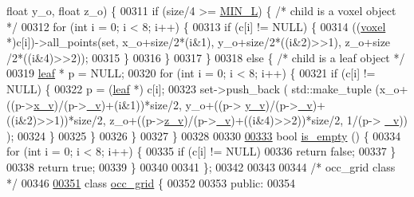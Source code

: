 \begin{DoxyCode}
{      float} y\_o, \textcolor{keywordtype}{float} z\_o) \{
00311         \textcolor{keywordflow}{if} (size/4 >= \hyperlink{Voxel_8hpp_a29d8f4bb35f9fa62e1d680bc6ab1f4f1}{MIN\_L}) \{ \textcolor{comment}{/* child is a voxel object */}
00312             \textcolor{keywordflow}{for} (\textcolor{keywordtype}{int} i = 0; i < 8; i++) \{
00313                 \textcolor{keywordflow}{if} (c[i] != NULL) \{
00314                     ((\hyperlink{classvoxel}{voxel} *)c[i])->all\_points(\textcolor{keyword}{set}, x\_o+size/2*(i&1), y\_o+size/2*((i&2)>>1), z\_o+size
      /2*((i&4)>>2));
00315                 \}
00316             \}
00317         \}
00318         \textcolor{keywordflow}{else} \{ \textcolor{comment}{/* child is a leaf object */}
00319             \hyperlink{classleaf}{leaf} * p = NULL;
00320             \textcolor{keywordflow}{for} (\textcolor{keywordtype}{int} i = 0; i < 8; i++) \{
00321                 \textcolor{keywordflow}{if} (c[i] != NULL) \{
00322                     p = (\hyperlink{classleaf}{leaf} *) c[i];
00323                     \textcolor{keyword}{set}->push\_back ( std::make\_tuple (x\_o+((p->\hyperlink{classleaf_ac34a93ca5739928d7389b12e735252d4}{x\_v})/(p->\hyperlink{classleaf_a4fc347dbd4f5911bbb477910588ed512}{\_v})+(i&1))*size/2, y\_o+((p->
      \hyperlink{classleaf_a06a94d40da44b846913db4d8900b2626}{y\_v})/(p->\hyperlink{classleaf_a4fc347dbd4f5911bbb477910588ed512}{\_v})+((i&2)>>1))*size/2, z\_o+((p->\hyperlink{classleaf_a5f51fe13eb6e53bd9549469011e7a10e}{z\_v})/(p->\hyperlink{classleaf_a4fc347dbd4f5911bbb477910588ed512}{\_v})+((i&4)>>2))*size/2, 1/(p->
      \hyperlink{classleaf_a4fc347dbd4f5911bbb477910588ed512}{\_v})) );
00324                 \}
00325             \}
00326         \}
00327     \}
00328 
00330 
\hypertarget{Voxel_8hpp_source.tex_l00333}{}\hyperlink{classvoxel_afe0d1d928ee0358b0fc0a67f58793cfd}{00333}     \textcolor{keywordtype}{bool} \hyperlink{classvoxel_afe0d1d928ee0358b0fc0a67f58793cfd}{is\_empty} () \{
00334         \textcolor{keywordflow}{for} (\textcolor{keywordtype}{int} i = 0; i < 8; i++) \{
00335             \textcolor{keywordflow}{if} (c[i] != NULL)
00336                 \textcolor{keywordflow}{return} \textcolor{keyword}{false};
00337         \}
00338         \textcolor{keywordflow}{return} \textcolor{keyword}{true};
00339     \}
00340 
00341 \};
00342 
00343 
00344 \textcolor{comment}{/* occ\_grid class */}
00346 
\hypertarget{Voxel_8hpp_source.tex_l00351}{}\hyperlink{classocc__grid}{00351} \textcolor{keyword}{class }\hyperlink{classocc__grid}{occ\_grid} \{
00352 
00353 \textcolor{keyword}{public}:
00354 

\end{DoxyCode}
